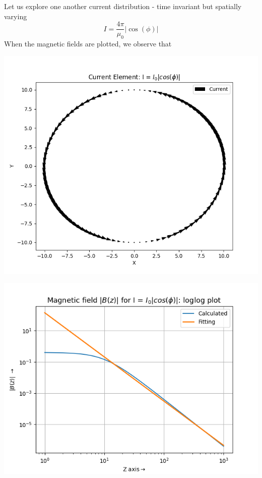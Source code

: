 \documentclass[12pt, a4paper]{report}
\begin{document}
Let us explore one another current distribution - time invariant but spatially varying
\begin{equation*}
I = \frac{4\pi}{\mu_0}|\cos({\phi})|
\end{equation*}
When the magnetic fields are plotted, we observe that
\begin{center}
	\includegraphics[scale=0.6]{Figure_6.png} 
	\label{fig:rawdata}
\end{center}
\begin{center}
	\includegraphics[scale=0.65]{Figure_7.png} 
	\label{fig:rawdata}
\end{center}
\end{document}
